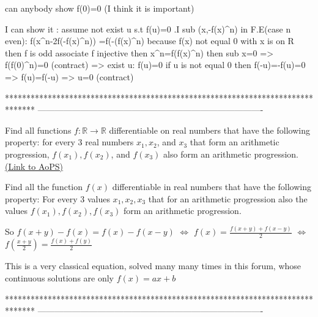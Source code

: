 \begin{solution}
	can anybody show f(0)=0 (I think it is important)
\end{solution}



\begin{solution}
	I can show it : assume not exist u s.t f(u)=0 .I sub (x,-f(x)^n) in F.E(case n even): f(x^n-2f(-f(x)^n)) =f(-(f(x)^n) because f(x) not equal 0 with x is on R then f is odd associate f injective then x^n=f(f(x)^n) then sub x=0 => f(f(0)^n)=0 (contract) => exist u: f(u)=0 if u is not equal 0 then f(-u)=-f(u)=0 => f(u)=f(-u) => u=0 (contract)
\end{solution}
*******************************************************************************
-------------------------------------------------------------------------------

\begin{problem}
	Find all functions $f:\mathbb R \to \mathbb R$ differentiable on real numbers that have the following property: for every $3$ real numbers $x_1,x_2$, and $x_3$ that form an arithmetic progression, $f(x_1),f(x_2)$, and $f(x_3)$ also form an arithmetic progression.
	\flushright \href{https://artofproblemsolving.com/community/c6h385634}{(Link to AoPS)}
\end{problem}



\begin{solution}
	\begin{tcolorbox}Find all the function $f(x)$ differentiable in real numbers that have the following property:  For every 3 values $x_1,x_2,x_3$ that for an arithmetic progression also the values $f(x_1),f(x_2),f(x_3)$ form an arithmetic progression.\end{tcolorbox}
So $f(x+y)-f(x)=f(x)-f(x-y)$ $\iff$ $f(x)=\frac{f(x+y)+f(x-y)}2$ $\iff$ $f(\frac{x+y}2)=\frac{f(x)+f(y)}2$

This is a very classical equation, solved many many times in this forum, whose continuous solutions are only $\boxed{f(x)=ax+b}$
\end{solution}
*******************************************************************************
-------------------------------------------------------------------------------

